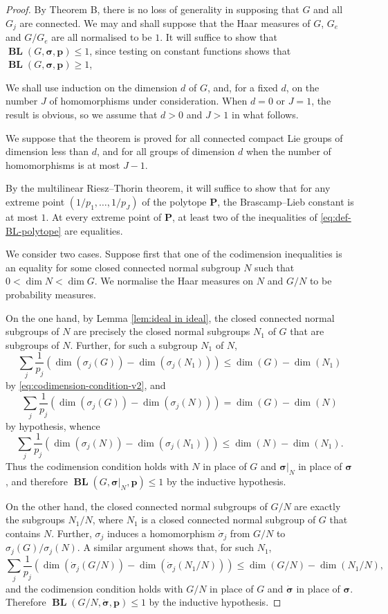 \documentclass[12pt,twoside,a4paper]{amsart}
\theoremstyle{definition}
\theoremstyle{remark}
\numberwithin{equation}{section}
\newcommand{\sfrac}[2]{#1 / #2}
\newcommand{\BL}{\operatorname{\mathbf{BL}}}
\newcommand{\bss}{\boldsymbol{\sigma}}
\newcommand{\bsds}{\boldsymbol{\dot\sigma}}
\newcommand{\Polytope}{\boldsymbol{P}}
\newcommand{\bsp}{\boldsymbol{p}}
\newcommand{\lpar}{\left( }
\newcommand{\rpar}{\right) }
\begin{document}
\begin{proof}
By Theorem B, there is no loss of generality in supposing that $G$ and all $G_j$ are connected.
We may and shall suppose that the Haar measures of $G$, $G_e$ and $G/G_e$ are all normalised to be $1$.
It will suffice to show that $\BL(G,\bss,\bsp) \leq 1$, since testing on constant functions shows that $\BL(G,\bss,\bsp) \geq 1$,

We shall use induction on the dimension $d$ of $G$, and, for a fixed $d$, on the number $J$ of homomorphisms under consideration.
When $d = 0$ or $J= 1$, the result is obvious, so we assume that $d >0$ and $J > 1$ in what follows.

We suppose that the theorem is proved for all connected compact Lie groups of dimension less than $d$, and for all groups of dimension $d$ when the number of homomorphisms is at most $J-1$.

By the multilinear Riesz--Thorin theorem, it will suffice to show that for any extreme point $(\sfrac{1}{p_1},\dots , \sfrac{1}{p_J})$ of the polytope $\Polytope$, the Brascamp--Lieb constant is at most $1$. 
At every extreme point of $\Polytope$, at least two of the inequalities of \eqref{eq:def-BL-polytope} are equalities. 


We consider two cases.
Suppose first that one of the codimension inequalities is an equality for some closed connected normal subgroup $N$ such that $0 < \dim N < \dim G$.
We normalise the Haar measures on $N$ and $G/N$ to be probability measures.

On the one hand, by Lemma \ref{lem:ideal in ideal}, the closed connected normal subgroups of $N$ are precisely the closed normal subgroups $N_1$ of $G$ that are subgroups of $N$.
Further, for such a subgroup $N_1$ of $N$,
\[
\sum_j \frac{1}{p_j} \lpar \dim(\sigma_j(G))  - \dim( \sigma_j (N_1) ) \rpar  \leq \dim(G) - \dim(N_1) 
\]
by \eqref{eq:codimension-condition-v2}, and
\[
\sum_j \frac{1}{p_j} \lpar \dim(\sigma_j(G))  - \dim( \sigma_j (N) ) \rpar = \dim(G) - \dim(N) 
\]
by hypothesis, whence
\[
\sum_j \frac{1}{p_j} \lpar \dim(\sigma_j(N))  - \dim( \sigma_j (N_1) ) \rpar  \leq \dim(N) - \dim(N_1) .
\]
Thus the codimension condition holds with $N$ in place of $G$ and $\bss|_N$ in place of $\bss$, and therefore $\BL(G, \bss|_N, \bsp) \leq 1$ by the inductive hypothesis.

On the other hand, the closed connected normal subgroups of $G/N$ are exactly the subgroups $N_1/N$, where $N_1$ is a closed connected normal subgroup of $G$ that contains $N$. 
Further, $\sigma_j$ induces a homomorphism $\dot\sigma_j$ from $G/N$ to $\sigma_j(G)/\sigma_j(N)$.
A similar argument shows that, for such $N_1$,
\[
\sum_j \frac{1}{p_j} \lpar \dim(\dot\sigma_j(G/N))  - \dim( \dot\sigma_j (N_1/N) ) \rpar  
\leq \dim(G/N) - \dim(N_1/N) ,
\]
and the codimension condition holds with $G/N$ in place of $G$ and $\bsds$ in place of $\bss$.
Therefore $\BL(G/N, \bsds, \bsp) \leq 1$ by the inductive hypothesis.


\end{proof}
\end{document}
